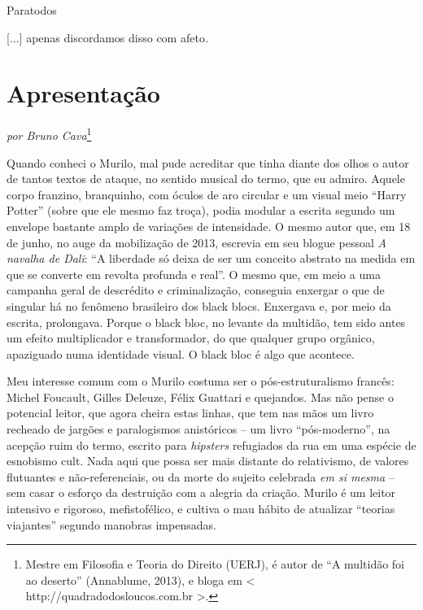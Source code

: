 
Paratodos

{[}...{]} apenas discordamos disso com afeto\emph{.}

\chapter{Apresentação}

\begin{flushright}
\emph{por Bruno Cava}\footnote{Mestre em Filosofia e Teoria do Direito (UERJ), é autor de ``A multidão foi ao deserto'' (Annablume, 2013), e bloga em \textless{} http://quadradodosloucos.com.br \textgreater{}.}
\end{flushright}

\textbf{}Quando conheci o Murilo, mal pude acreditar que tinha diante
dos olhos o autor de tantos textos de ataque, no sentido musical do
termo, que eu admiro. Aquele corpo franzino, branquinho, com óculos de
aro circular e um visual meio ``Harry Potter'' (sobre que ele mesmo faz
troça), podia modular a escrita segundo um envelope bastante amplo de
variações de intensidade. O mesmo autor que, em 18 de junho, no auge da
mobilização de 2013, escrevia em seu blogue pessoal \emph{A navalha de
Dali}: ``A liberdade só deixa de ser um conceito abstrato na medida em
que se converte em revolta profunda e real''. O mesmo que, em meio a uma
campanha geral de descrédito e criminalização, conseguia enxergar o que
de singular há no fenômeno brasileiro dos black blocs. Enxergava e, por
meio da escrita, prolongava. Porque o black bloc, no levante da
multidão, tem sido antes um efeito multiplicador e transformador, do que
qualquer grupo orgânico, apaziguado numa identidade visual. O black bloc
é algo que acontece.

Meu interesse comum com o Murilo costuma ser o pós-estruturalismo
francês: Michel Foucault, Gilles Deleuze, Félix Guattari e quejandos.
Mas não pense o potencial leitor, que agora cheira estas linhas, que tem
nas mãos um livro recheado de jargões e paralogismos anistóricos -- um
livro ``pós-moderno'', na acepção ruim do termo, escrito para
\emph{hipsters} refugiados da rua em uma espécie de esnobismo cult. Nada
aqui que possa ser mais distante do relativismo, de valores flutuantes e
não-referenciais, ou da morte do sujeito celebrada \emph{em si mesma} --
sem casar o esforço da destruição com a alegria da criação. Murilo é um
leitor intensivo e rigoroso, mefistofélico, e cultiva o mau hábito de
atualizar ``teorias viajantes'' segundo manobras impensadas.

